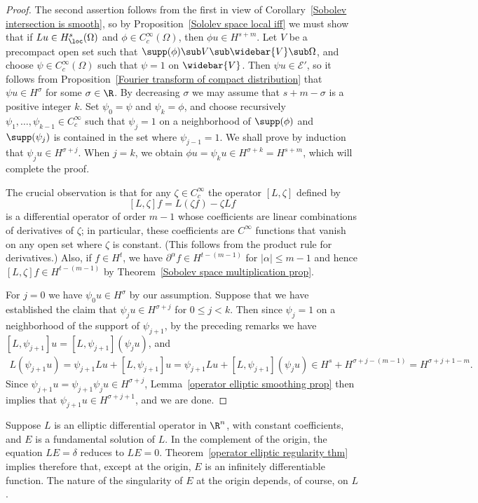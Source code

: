 \begin{proof}
The second assertion follows from the first in view of Corollary~\ref{Sobolev intersection is smooth}, so by Proposition~\ref{Sololev space local iff} we must show that if $Lu\in H^s_{\loc}(\Omega)$ and $\phi\in C^\infty_c(\Omega)$, then $\phi u\in H^{s+m}$. Let $V$ be a precompact open set such that $\supp(\phi)\sub V\sub\widebar{V}\sub\Omega$, and choose $\psi\in C_c^\infty(\Omega)$ such that $\psi=1$ on $\widebar{V}$. Then $\psi u\in\mathscr{E}'$, so it follows from Proposition~\ref{Fourier transform of compact distribution} that $\psi u\in H^\sigma$ for some $\sigma\in\R$. By decreasing $\sigma$ we may assume that $s+m-\sigma$ is a positive integer $k$. Set $\psi_0=\psi$ and $\psi_k=\phi$, and choose recursively $\psi_1,\dots,\psi_{k-1}\in C^\infty_c$ such that $\psi_j=1$ on a neighborhood of $\supp(\phi)$ and $\supp(\psi_j)$ is contained in the set where $\psi_{j-1}=1$. We shall prove by induction that $\psi_ju\in H^{\sigma+j}$. When $j=k$, we obtain $\phi u=\psi_ku\in H^{\sigma+k}=H^{s+m}$, which will complete the proof.\par
The crucial observation is that for any $\zeta\in C^\infty_c$ the operator $[L,\zeta]$ defined by
\[[L,\zeta]f=L(\zeta f)-\zeta Lf\]
is a differential operator of order $m-1$ whose coefficients are linear combinations of derivatives of $\zeta$; in particular, these coefficients are $C^\infty$ functions that vanish on any open set where $\zeta$ is constant. (This follows from the product rule for derivatives.) Also, if $f\in H^t$, we have $\partial^\alpha f\in H^{t-(m-1)}$ for $|\alpha|\leq m-1$ and hence $[L,\zeta]f\in H^{t-(m-1)}$ by Theorem~\ref{Sobolev space multiplication prop}.\par
For $j=0$ we have $\psi_0u\in H^\sigma$ by our assumption. Suppose that we have established the claim that $\psi_ju\in H^{\sigma+j}$ for $0\leq j<k$. Then since $\psi_j=1$ on a neighborhood of the support of $\psi_{j+1}$, by the preceding remarks we have $[L,\psi_{j+1}]u=[L,\psi_{j+1}](\psi_ju)$, and 
\begin{align*}
L(\psi_{j+1}u)=\psi_{j+1}Lu+[L,\psi_{j+1}]u=\psi_{j+1}Lu+[L,\psi_{j+1}](\psi_ju)\in H^s+H^{\sigma+j-(m-1)}=H^{\sigma+j+1-m}.
\end{align*}
Since $\psi_{j+1}u=\psi_{j+1}\psi_ju\in H^{\sigma+j}$, Lemma~\ref{operator elliptic smoothing prop} then implies that $\psi_{j+1}u\in H^{\sigma+j+1}$, and we are done.
\end{proof}
\begin{example}
Suppose $L$ is an elliptic differential operator in $\R^n$, with constant coefficients, and $E$ is a fundamental solution of $L$. In the complement of the origin, the equation $LE=\delta$ reduces to $LE=0$. Theorem~\ref{operator elliptic regularity thm} implies therefore that, except at the origin, $E$ is an infinitely differentiable function. The nature of the singularity of $E$ at the origin depends, of course, on $L$.
\end{example}
